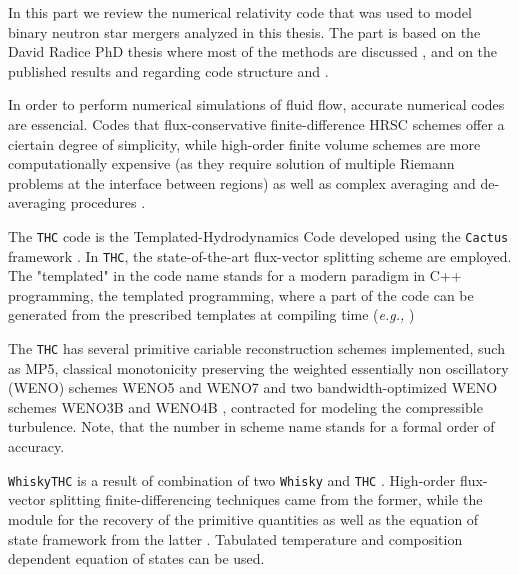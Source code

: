 In this part we review the numerical relativity code that was used to model binary neutron star mergers analyzed in this thesis.
The part is based on the David Radice PhD thesis where most of the methods are discussed \cite{Radice:2013apa}, and on the published results and regarding code structure and \cite{Radice:2012cu,Radice:2013xpa,Radice:2013hxh,Radice:2015nva}.

In order to perform numerical simulations of fluid flow, accurate numerical codes are essencial. Codes that flux-conservative finite-difference HRSC schemes offer a ciertain degree of simplicity, while high-order finite volume schemes are more computationally expensive (as they require solution of multiple Riemann problems at the interface between regions) \cite{Reisswig:2009us,Shu:2001rep} as well as complex averaging and de-averaging procedures \cite{Tchekhovskoy:2007zn}.

The \texttt{THC} code is the Templated-Hydrodynamics Code developed using the \texttt{Cactus} framework \cite{Goodale:2003}. In \texttt{THC}, the state-of-the-art flux-vector splitting scheme are employed. The "templated" in the code name stands for a modern paradigm in C++ programming, the templated programming, where a part of the code can be generated from the prescribed templates at compiling time (\textit{e.g.,} \cite{Yang:2001})

The \texttt{THC} has several primitive cariable reconstruction schemes implemented, such as MP5, classical monotonicity preserving \cite{Suresh:1997,Mignone:2010} the weighted essentially non oscillatory (WENO) schemes WENO5 and WENO7 \cite{Liu:1994,Jiang:1996,Shu:1997} and two bandwidth-optimized WENO schemes WENO3B and WENO4B \cite{Martin:2006,Taylor:2007}, contracted for modeling the compressible turbulence. Note, that the number in scheme name stands for a formal order of accuracy.

\texttt{WhiskyTHC} is a result of combination of two \texttt{Whisky} \cite{Baiotti:2004wn} and \texttt{THC} \cite{Radice:2012cu}. High-order flux-vector splitting finite-differencing techniques came from the former, while the module for the recovery of the primitive quantities as well as the equation of state framework from the latter \cite{Galeazzi:2013mia}. Tabulated temperature and composition dependent equation of states can be used.

